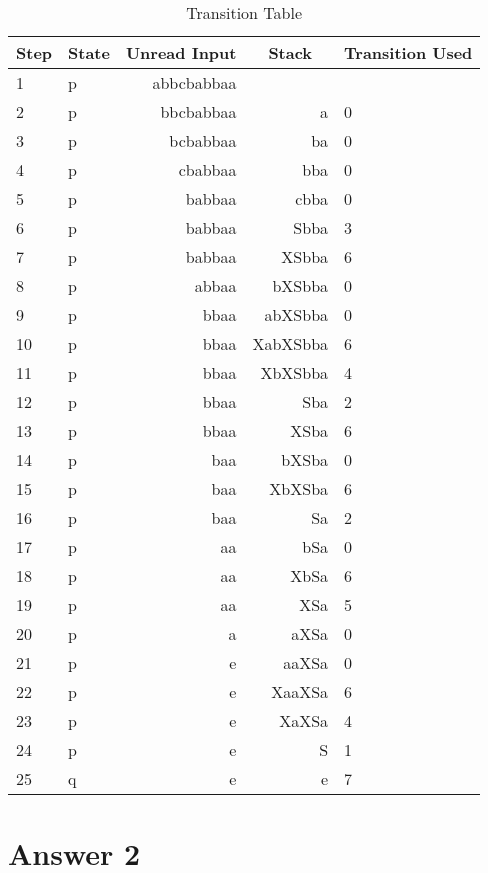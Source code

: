 \documentclass[12pt]{article}
\begin{document}
\begin{table}[H]
\centering
\caption{Transition Table}
\label{my-label}
\begin{tabular}{|l|l|r|r|l|}
\hline
\multicolumn{1}{|c|}{\textbf{Step}} & \multicolumn{1}{c|}{\textbf{State}} & \multicolumn{1}{c|}{\textbf{Unread Input}} & \multicolumn{1}{c|}{\textbf{Stack}} & \multicolumn{1}{c|}{\textbf{Transition Used}} \\ \hline
1& p& abbcbabbaa &&\\ \hline
2& p& bbcbabbaa & a & 0\\ \hline
3& p& bcbabbaa & ba & 0\\ \hline
4& p& cbabbaa & bba & 0\\ \hline
5& p& babbaa & cbba & 0\\ \hline
6& p& babbaa & Sbba & 3\\ \hline
7& p& babbaa & XSbba & 6\\ \hline
8& p& abbaa & bXSbba & 0\\ \hline
9& p& bbaa & abXSbba & 0\\ \hline
10& p& bbaa & XabXSbba & 6\\ \hline
11& p& bbaa & XbXSbba & 4\\ \hline
12& p& bbaa & Sba & 2\\ \hline
13& p& bbaa & XSba & 6\\ \hline
14 & p  & baa & bXSba & 0 \\ \hline
15 & p  & baa & XbXSba & 6 \\ \hline
16 & p  & baa & Sa & 2 \\ \hline
17 & p  & aa  & bSa   & 0 \\ \hline
18 & p  & aa  & XbSa  & 6 \\ \hline
19 & p  & aa  & XSa   & 5 \\ \hline
20 & p  & a   & aXSa  & 0 \\ \hline
21 & p  & e   & aaXSa & 0 \\ \hline
22 & p  & e   & XaaXSa & 6 \\ \hline
23 & p  & e   & XaXSa & 4 \\ \hline
24 & p  & e   & S  & 1 \\ \hline
25 & q  & e   & e  & 7 \\ \hline
\end{tabular}
\end{table}

\section*{Answer 2}
\end{document}
